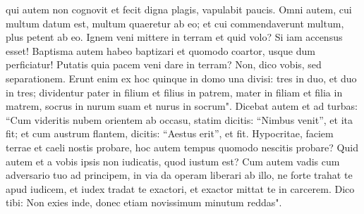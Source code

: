 \begin{biblechapter}
\verse qui autem non cognovit et fecit digna plagis, vapulabit paucis. Omni autem, cui multum datum est, multum quaeretur ab eo; et cui commendaverunt multum, plus petent ab eo. 
\verse Ignem veni mittere in terram et quid volo? Si iam accensus esset! 
\verse Baptisma autem habeo baptizari et quomodo coartor, usque dum perficiatur! 
\verse Putatis quia pacem veni dare in terram? Non, dico vobis, sed separationem.  
\verse Erunt enim ex hoc quinque in domo una divisi: tres in duo, et duo in tres;  
\verse dividentur pater in filium et filius in patrem, mater in filiam et filia in matrem, socrus in nurum suam et nurus in socrum". 
\verse Dicebat autem et ad turbas: “Cum videritis nubem orientem ab occasu, statim dicitis: “Nimbus venit”, et ita fit; 
\verse et cum austrum flantem, dicitis: “Aestus erit”, et fit. 
\verse Hypocritae, faciem terrae et caeli nostis probare, hoc autem tempus quomodo nescitis probare? 
\verse Quid autem et a vobis ipsis non iudicatis, quod iustum est? 
\verse Cum autem vadis cum adversario tuo ad principem, in via da operam liberari ab illo, ne forte trahat te apud iudicem, et iudex tradat te exactori, et exactor mittat te in carcerem. 
\verse Dico tibi: Non exies inde, donec etiam novissimum minutum reddas". 
\end{biblechapter}


